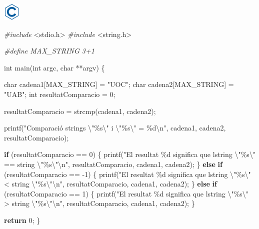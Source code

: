 \documentclass[]{book}
\newenvironment{Shaded}{\begin{snugshade}}{\end{snugshade}}
\newcommand{\ControlFlowTok}[1]{\textcolor[rgb]{0.13,0.29,0.53}{\textbf{#1}}}
\newcommand{\DataTypeTok}[1]{\textcolor[rgb]{0.13,0.29,0.53}{#1}}
\newcommand{\DecValTok}[1]{\textcolor[rgb]{0.00,0.00,0.81}{#1}}
\newcommand{\ImportTok}[1]{#1}
\newcommand{\NormalTok}[1]{#1}
\newcommand{\PreprocessorTok}[1]{\textcolor[rgb]{0.56,0.35,0.01}{\textit{#1}}}
\newcommand{\SpecialCharTok}[1]{\textcolor[rgb]{0.00,0.00,0.00}{#1}}
\newcommand{\StringTok}[1]{\textcolor[rgb]{0.31,0.60,0.02}{#1}}
\begin{document}
\includegraphics{./img/c.png}

\begin{Shaded}
\begin{Highlighting}[]
\PreprocessorTok{\#include }\ImportTok{\textless{}stdio.h\textgreater{}}
\PreprocessorTok{\#include }\ImportTok{\textless{}string.h\textgreater{}}

\PreprocessorTok{\#define MAX\_STRING 3+1}

\DataTypeTok{int}\NormalTok{ main(}\DataTypeTok{int}\NormalTok{ argc, }\DataTypeTok{char}\NormalTok{ **argv) \{}

    \DataTypeTok{char}\NormalTok{ cadena1[MAX\_STRING] = }\StringTok{"UOC"}\NormalTok{;}
    \DataTypeTok{char}\NormalTok{ cadena2[MAX\_STRING] = }\StringTok{"UAB"}\NormalTok{;}
    \DataTypeTok{int}\NormalTok{ resultatComparacio = }\DecValTok{0}\NormalTok{;}
    
\NormalTok{    resultatComparacio = strcmp(cadena1, cadena2);}
    
\NormalTok{    printf(}\StringTok{"Comparació strings }\SpecialCharTok{\textbackslash{}"}\StringTok{\%s}\SpecialCharTok{\textbackslash{}"}\StringTok{ i }\SpecialCharTok{\textbackslash{}"}\StringTok{\%s}\SpecialCharTok{\textbackslash{}"}\StringTok{ = \%d}\SpecialCharTok{\textbackslash{}n}\StringTok{"}\NormalTok{, cadena1, cadena2, resultatComparacio);}
    
    \ControlFlowTok{if}\NormalTok{ (resultatComparacio == }\DecValTok{0}\NormalTok{) \{}
\NormalTok{        printf(}\StringTok{"El resultat \%d significa que l\textquotesingle{}string }\SpecialCharTok{\textbackslash{}"}\StringTok{\%s}\SpecialCharTok{\textbackslash{}"}\StringTok{ == string }\SpecialCharTok{\textbackslash{}"}\StringTok{\%s}\SpecialCharTok{\textbackslash{}"\textbackslash{}n}\StringTok{"}\NormalTok{, resultatComparacio, cadena1, cadena2);}
\NormalTok{    \} }\ControlFlowTok{else} \ControlFlowTok{if}\NormalTok{ (resultatComparacio == {-}}\DecValTok{1}\NormalTok{) \{}
\NormalTok{        printf(}\StringTok{"El resultat \%d significa que l\textquotesingle{}string }\SpecialCharTok{\textbackslash{}"}\StringTok{\%s}\SpecialCharTok{\textbackslash{}"}\StringTok{ \textless{} string }\SpecialCharTok{\textbackslash{}"}\StringTok{\%s}\SpecialCharTok{\textbackslash{}"\textbackslash{}n}\StringTok{"}\NormalTok{, resultatComparacio, cadena1, cadena2);}
\NormalTok{    \} }\ControlFlowTok{else} \ControlFlowTok{if}\NormalTok{ (resultatComparacio == }\DecValTok{1}\NormalTok{) \{}
\NormalTok{        printf(}\StringTok{"El resultat \%d significa que l\textquotesingle{}string }\SpecialCharTok{\textbackslash{}"}\StringTok{\%s}\SpecialCharTok{\textbackslash{}"}\StringTok{ \textgreater{} string }\SpecialCharTok{\textbackslash{}"}\StringTok{\%s}\SpecialCharTok{\textbackslash{}"\textbackslash{}n}\StringTok{"}\NormalTok{, resultatComparacio, cadena1, cadena2);     }
\NormalTok{    \}}
    
    \ControlFlowTok{return} \DecValTok{0}\NormalTok{;}
\NormalTok{\}}
\end{Highlighting}
\end{Shaded}
\end{document}

